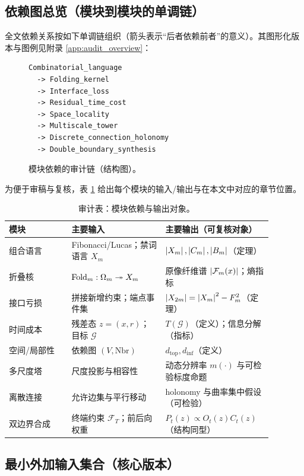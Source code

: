\subsection{依赖图总览（模块到模块的单调链）}

全文依赖关系按如下单调链组织（箭头表示“后者依赖前者”的意义）。其图形化版本与图例见附录 \ref{app:audit_overview}：

\begin{figure}[H]
\centering
\begin{verbatim}
Combinatorial_language
  -> Folding_kernel
  -> Interface_loss
  -> Residual_time_cost
  -> Space_locality
  -> Multiscale_tower
  -> Discrete_connection_holonomy
  -> Double_boundary_synthesis
\end{verbatim}
\caption{模块依赖的审计链（结构图）。}
\end{figure}

为便于审稿与复核，表 \ref{tab:audit-deps} 给出每个模块的输入/输出与在本文中对应的章节位置。

\begin{table}[H]
\centering
\begin{tabular}{p{0.22\linewidth} p{0.33\linewidth} p{0.33\linewidth}}
\toprule
\textbf{模块} & \textbf{主要输入} & \textbf{主要输出（可复核对象）}\\
\midrule
组合语言 & Fibonacci/Lucas；禁词语言 $X_m$ & $\left\lvert X_m\right\rvert,\left\lvert C_m\right\rvert,\left\lvert B_m\right\rvert$（定理）\\
折叠核 & $\mathrm{Fold}_m:\Omega_m\twoheadrightarrow X_m$ & 原像纤维谱 $\left\lvert \mathcal F_m(x)\right\rvert$；熵指标\\
接口亏损 & 拼接新增约束；端点事件集 & $\left\lvert X_{2m}\right\rvert=\left\lvert X_m\right\rvert^2-F_m^2$（定理）\\
时间成本 & 残差态 $z=(x,r)$；目标 $\mathcal G$ & $T(\mathcal G)$（定义）；信息分解（指标）\\
空间/局部性 & 依赖图 $(V,\mathrm{Nbr})$ & $d_{\mathrm{top}},d_{\mathrm{inf}}$（定义）\\
多尺度塔 & 尺度投影与相容性 & 动态分辨率 $m(\cdot)$ 与可检验标度命题\\
离散连接 & 允许边集与平行移动 & holonomy 与曲率集中假设（可检验）\\
双边界合成 & 终端约束 $\mathcal F_T$；前后向权重 & $P_t(z)\propto O_t(z)C_t(z)$（结构同型）\\
\bottomrule
\end{tabular}
\caption{审计表：模块依赖与输出对象。}
\label{tab:audit-deps}
\end{table}

\subsection{最小外加输入集合（核心版本）}

